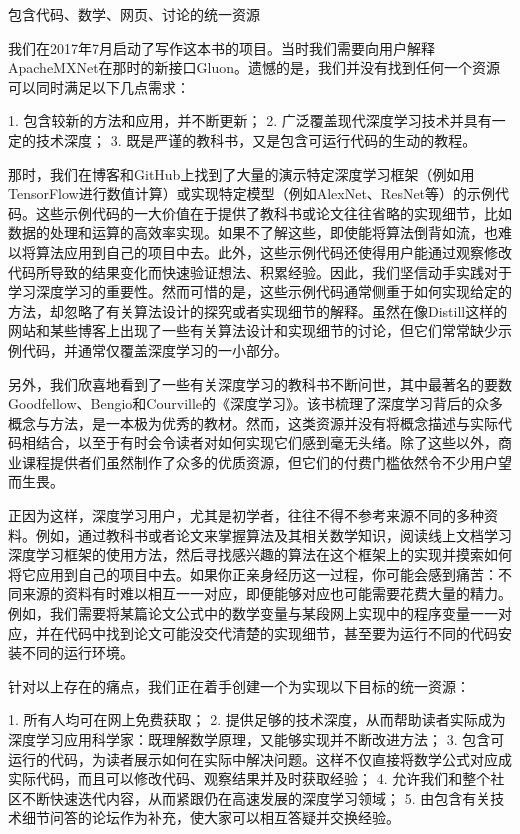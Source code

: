  包含代码、数学、网页、讨论的统一资源

我们在2017年7月启动了写作这本书的项目。当时我们需要向用户解释ApacheMXNet在那时的新接口Gluon。遗憾的是，我们并没有找到任何一个资源可以同时满足以下几点需求：

1. 包含较新的方法和应用，并不断更新；
2. 广泛覆盖现代深度学习技术并具有一定的技术深度；
3. 既是严谨的教科书，又是包含可运行代码的生动的教程。

那时，我们在博客和GitHub上找到了大量的演示特定深度学习框架（例如用TensorFlow进行数值计算）或实现特定模型（例如AlexNet、ResNet等）的示例代码。这些示例代码的一大价值在于提供了教科书或论文往往省略的实现细节，比如数据的处理和运算的高效率实现。如果不了解这些，即使能将算法倒背如流，也难以将算法应用到自己的项目中去。此外，这些示例代码还使得用户能通过观察修改代码所导致的结果变化而快速验证想法、积累经验。因此，我们坚信动手实践对于学习深度学习的重要性。然而可惜的是，这些示例代码通常侧重于如何实现给定的方法，却忽略了有关算法设计的探究或者实现细节的解释。虽然在像Distill这样的网站和某些博客上出现了一些有关算法设计和实现细节的讨论，但它们常常缺少示例代码，并通常仅覆盖深度学习的一小部分。

另外，我们欣喜地看到了一些有关深度学习的教科书不断问世，其中最著名的要数Goodfellow、Bengio和Courville的《深度学习》。该书梳理了深度学习背后的众多概念与方法，是一本极为优秀的教材。然而，这类资源并没有将概念描述与实际代码相结合，以至于有时会令读者对如何实现它们感到毫无头绪。除了这些以外，商业课程提供者们虽然制作了众多的优质资源，但它们的付费门槛依然令不少用户望而生畏。

正因为这样，深度学习用户，尤其是初学者，往往不得不参考来源不同的多种资料。例如，通过教科书或者论文来掌握算法及其相关数学知识，阅读线上文档学习深度学习框架的使用方法，然后寻找感兴趣的算法在这个框架上的实现并摸索如何将它应用到自己的项目中去。如果你正亲身经历这一过程，你可能会感到痛苦：不同来源的资料有时难以相互一一对应，即便能够对应也可能需要花费大量的精力。例如，我们需要将某篇论文公式中的数学变量与某段网上实现中的程序变量一一对应，并在代码中找到论文可能没交代清楚的实现细节，甚至要为运行不同的代码安装不同的运行环境。

针对以上存在的痛点，我们正在着手创建一个为实现以下目标的统一资源：

1. 所有人均可在网上免费获取；
2. 提供足够的技术深度，从而帮助读者实际成为深度学习应用科学家：既理解数学原理，又能够实现并不断改进方法；
3. 包含可运行的代码，为读者展示如何在实际中解决问题。这样不仅直接将数学公式对应成实际代码，而且可以修改代码、观察结果并及时获取经验；
4. 允许我们和整个社区不断快速迭代内容，从而紧跟仍在高速发展的深度学习领域；
5. 由包含有关技术细节问答的论坛作为补充，使大家可以相互答疑并交换经验。

